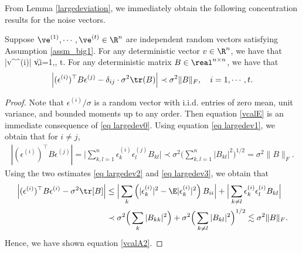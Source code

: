 \documentclass[aos,preprint]{imsart}
\begin{document}

From Lemma \ref{largedeviation}, we immediately obtain the following concentration results for the noise vectors.
 
\begin{corollary}\label{cor_calE}
Suppose $\ve^{(1)},\cdots,\ve^{(t)}\in \R^{n}$ are independent random vectors satisfying Assumption \ref{assm_big1}.  
For any deterministic vector $v\in \R^n$, we have that  
\be\label{vcalE}
	|v^\top \epsilon^{(i)}| \prec  \sigma \|v\| ,\quad i=1,\cdots, t. %
\ee
For any deterministic matrix $B \in \real^{n\times n}$, we have that  
\begin{align}\label{vcalA2}
	\left|(\epsilon^{(i)})^\top B \epsilon^{(j)} - \delta_{ij}\cdot \sigma^2 \tr(B)\right| \prec \sigma^2 \|B\|_F,\quad   i=1,\cdots, t.  
\end{align}
\end{corollary}
\begin{proof}
Note that $\epsilon^{(i)}/\sigma$ is a random vector with i.i.d. entries of zero mean, unit variance, and bounded moments up to any order. Then equation \eqref{vcalE} is an immediate consequence of \eqref{eq largedev0}.
Using equation \eqref{eq largedev1}, we obtain that for $i\ne j$,
 \begin{align*}
\left|(\epsilon^{(i)})^\top B \epsilon^{(j)}\right| = \Big|\sum_{k,l=1}^n \epsilon^{(i)}_k\epsilon^{(j)}_l B_{kl} \Big| \prec \sigma^2 \Big(\sum_{k,l=1}^n|B_{kl}|^2\Big)^{1/2}=\sigma^2 \|B\|_F.
 \end{align*}
Using the two estimates \eqref{eq largedev2} and \eqref{eq largedev3}, we obtain that 
\begin{align*}
\left|(\epsilon^{(i)})^\top B \epsilon^{(i)} - \sigma^2 \tr[B]\right| &\le \Big| \sum_{k}  \left(|\epsilon^{(i)}_k|^2-\E|\epsilon^{(i)}_k|^2\right)B_{ii} \Big|+\Big| \sum_{ k\ne l } \epsilon^{(i)}_k \epsilon^{(i)}_l B_{kl} \Big| \\
&\prec \sigma^2 \Big( \sum_{k}|B_{kk}|^2\Big)+ \sigma^2 \Big( \sum_{k\ne l}|B_{kl}|^2\Big)^{1/2}\lesssim \sigma^2 \|B\|_F.
\end{align*}
Hence, we have shown equation \eqref{vcalA2}. %
\end{proof}
\end{document}
